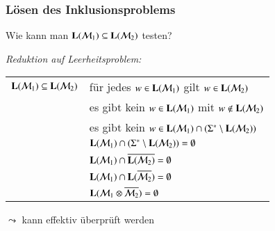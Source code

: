 \documentclass[onlymath]{beamer}
\begin{document}
\begin{frame}\frametitle{Lösen des Inklusionsproblems}

Wie kann man $\textbf{\textcolor{black}{L}}(\mathcal{M}_1)\subseteq\textbf{\textcolor{black}{L}}(\mathcal{M}_2)$ testen?\pause
\bigskip

\emph{Reduktion auf Leerheitsproblem:}\medskip

\begin{tabular}{r@{~~~ gdw ~~~}l}
$\textbf{\textcolor{black}{L}}(\mathcal{M}_1)\subseteq\textbf{\textcolor{black}{L}}(\mathcal{M}_2)$
	& für jedes $w\in \textbf{\textcolor{black}{L}}(\mathcal{M}_1)$ gilt $w\in \textbf{\textcolor{black}{L}}(\mathcal{M}_2)$\\\pause
	& es gibt kein $w\in\textbf{\textcolor{black}{L}}(\mathcal{M}_1)$ mit $w\notin\textbf{\textcolor{black}{L}}(\mathcal{M}_2)$ \\\pause
	& es gibt kein $w\in\textbf{\textcolor{black}{L}}(\mathcal{M}_1)\cap (\Sigma^*\setminus\textbf{\textcolor{black}{L}}(\mathcal{M}_2))$ \\\pause
	& $\textbf{\textcolor{black}{L}}(\mathcal{M}_1)\cap (\Sigma^*\setminus\textbf{\textcolor{black}{L}}(\mathcal{M}_2))=\emptyset$ \\\pause
	& $\textbf{\textcolor{black}{L}}(\mathcal{M}_1)\cap\overline{\textbf{\textcolor{black}{L}}(\mathcal{M}_2)}= \emptyset$ \\\pause
	& $\textbf{\textcolor{black}{L}}(\mathcal{M}_1)\cap\textbf{\textcolor{black}{L}}(\overline{\mathcal{M}_2})= \emptyset$ \\\pause
	& $\textbf{\textcolor{black}{L}}(\mathcal{M}_1\otimes\overline{\mathcal{M}_2})= \emptyset$
\end{tabular}\medskip

$\leadsto$ kann effektiv überprüft werden

\end{frame}
\end{document}
